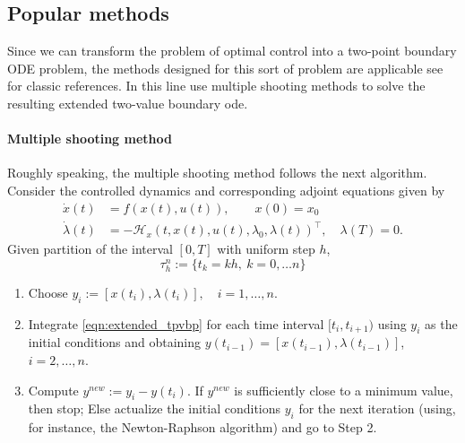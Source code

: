 \subsection{Popular methods}
Since we can transform the problem of optimal control into a two-point 
boundary ODE problem, the methods designed for this sort of problem are 
applicable see \cite{Keller1976, Ascher1987} for classic references. In this 
line \cite{Caetano2001,Yan2008} use multiple shooting methods to solve the 
resulting extended two-value boundary ode.
\paragraph{Multiple shooting method}
Roughly speaking, the multiple shooting method follows the next algorithm.
Consider the controlled dynamics and corresponding adjoint equations given by
\begin{equation}
\label{eqn:extended_tpvbp}
\begin{aligned}
\dot{x}(t) &= 
f(x(t), u(t)), \qquad x(0)=x_0 \\
\dot{\lambda}(t) &=
-\mathcal{H}_x(t,x(t),u(t),\lambda_0,\lambda(t))^\top, \quad 
\lambda(T)=0.
\end{aligned}
\end{equation}
Given  partition of the interval $[0, T]$ with uniform step $h$,
$$
\tau_h^n:= \{t_k = kh, \ k=0,\dots n\}
$$
\begin{enumerate}[Step 1]
  \item
  Choose $y_i := [x(t_i ), \lambda(t_i )], \quad i = 1,\dots, n$. 
  \item 
  Integrate \eqref{eqn:extended_tpvbp} for each time interval $[t_i , 
  t_{i+1})$ 
  using $y_i$ as the initial conditions and
  obtaining $y(t_{i−1}) = [x(t_{i−1}), \lambda(t_{i−1})]$, 
  $i=2, \dots, n$.
  \item
  Compute $y^{new}:= y_i − y(t_i )$.  
  If $y^{new}$ is sufficiently close to a minimum value, then stop; 
  Else actualize the initial conditions $y_i$ 
  for the next iteration (using, for instance, the Newton-Raphson 
  algorithm) and go to  Step 2.   
\end{enumerate}  

